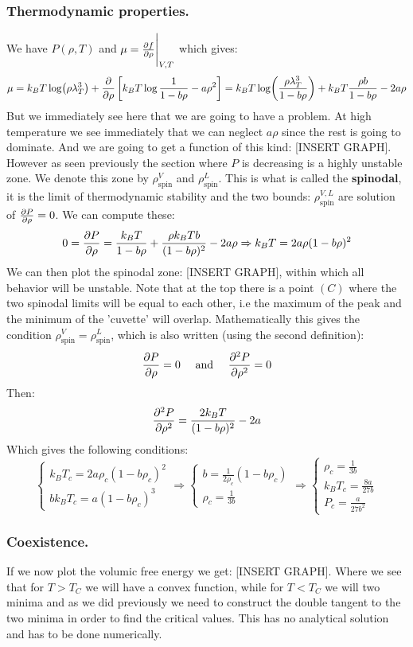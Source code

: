 \documentclass[10pt,a4paper]{book}
\begin{document}
\subsubsection{Thermodynamic properties.}
We have $P(\rho, T)$ and $\mu = \pdv{f}{\rho}\Bigg|_{V, T}$ which gives:
\[
\mu = k_B T \log (\rho \lambda^3_T)  + \pdv{}{\rho} \left[k_B T \log \frac{1}{1 - b \rho} - a \rho^2\right] = k_B T \log(\frac{\rho \lambda^3_T}{1 - b \rho}) + k_B T\frac{\rho b}{1 - b \rho} - 2 a \rho
\]
But we immediately see here that we are going to have a problem. At high temperature we see immediately that we can neglect $a \rho$ since the rest is going to dominate. And we are going to get a function of this kind: [INSERT GRAPH]. However as seen previously the section where $P$ is decreasing is a highly unstable zone. We denote this zone by $\rho_\text{spin}^V$ and $\rho_\text{spin}^L$. This is what is called the \textbf{spinodal}, it is the limit of thermodynamic stability and the two bounds: $\rho_\text{spin}^{V,L}$ are solution of $\pdv{P}{\rho} = 0$. We can compute these:
\[
0 = \pdv{P}{\rho} = \frac{k_B T}{1 - b \rho} + \frac{\rho k_B T b}{(1 - b \rho)^2} - 2 a\rho \Rightarrow k_B T = 2 a \rho(1 - b \rho)^2
\]
We can then plot the spinodal zone: [INSERT GRAPH], within which all behavior will be unstable. Note that at the top there is a point $(C)$ where the two spinodal limits will be equal to each other, i.e the maximum of the peak and the minimum of the 'cuvette' will overlap. Mathematically this gives the condition $\rho_\text{spin}^V = \rho_\text{spin}^L$, which is also written (using the second definition):
\[
\pdv{P}{\rho} = 0 \quad \text{ and } \quad \pdv[2]{P}{\rho} = 0
\]
Then:
\[
\pdv[2]{P}{\rho} = \frac{2 k_B T}{(1 - b \rho)^2} - 2 a
\]
Which gives the following conditions:
\[
\begin{cases}
k_B T_c = 2 a \rho_c (1-  b \rho_c)^2\\
b k_B T_c = a (1 - b \rho_c)^3
\end{cases}
\Rightarrow \begin{cases}
b = \frac{1}{2 \rho_c} (1 - b \rho_c)\\
\rho_c =\frac{1}{3 b}
\end{cases} \Rightarrow \begin{cases}
\rho_c = \frac{1}{3b}\\
k_B T_c = \frac{8a}{27 b}\\
P_c = \frac{a}{27 b^2}
\end{cases}
\]

\subsubsection{Coexistence.}
If we now plot the volumic free energy we get: [INSERT GRAPH]. Where we see that for $T > T_C$ we will have a convex function, while for $T < T_C$ we will two minima and as we did previously we need to construct the double tangent to the two minima in order to find the critical values. This has no analytical solution and has to be done numerically.
\end{document}
